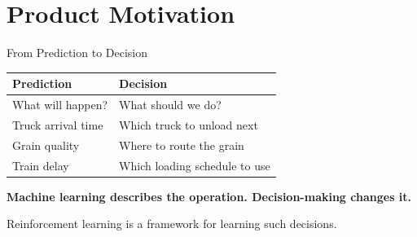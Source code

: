 \section{Product Motivation}

\begin{frame}{From Prediction to Decision}
  \centering
  \begin{tabular}{p{}p{}}
    \toprule
    \textbf{Prediction} & \textbf{Decision} \\
    \midrule
    What will happen? & What should we do? \\
    Truck arrival time & Which truck to unload next \\
    Grain quality & Where to route the grain \\
    Train delay & Which loading schedule to use \\
    \bottomrule
  \end{tabular}

  \vspace{0.65cm}
  \textbf{Machine learning describes the operation. Decision-making changes it.}

  \vspace{0.35cm}
  Reinforcement learning is a framework for learning such decisions.
\end{frame}

